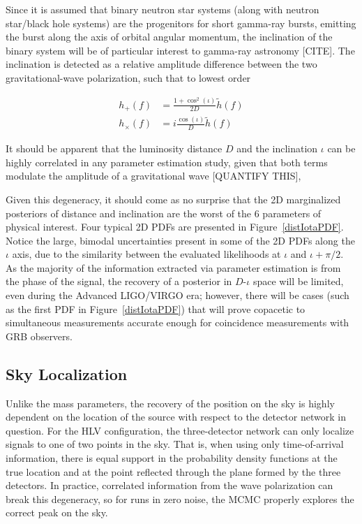 \documentclass[11pt,a4paper]{emulateapj}
\newcommand{\carl}[1]{{\color{red}  #1}}
\begin{document}
Since it is assumed that binary neutron star systems (along with neutron star/black hole systems) are the progenitors for short gamma-ray bursts, emitting the burst along the axis of orbital angular momentum, the inclination of the binary system will be of particular interest to gamma-ray astronomy \carl{[CITE]}.  The inclination is detected as a relative amplitude difference between the two gravitational-wave polarization, such that to lowest order

\begin{align}
h_+(f) &= \frac{1+\cos^2(\iota)}{2 D} \tilde{h}(f) \nonumber \\
h_\times(f) &= i \frac{\cos(\iota)}{D}\tilde{h}(f)
\end{align}

\noindent It should be apparent that the luminosity distance $D$ and the inclination $\iota$ can be highly correlated in any parameter estimation study, given that both terms modulate the amplitude of a gravitational wave \carl{[QUANTIFY THIS]}, 

Given this degeneracy, it should come as no surprise that the 2D marginalized posteriors of distance and inclination are the worst of the 6 
parameters of physical interest.  Four typical 2D PDFs are presented in Figure~\ref{distIotaPDF}.  Notice the large, bimodal uncertainties 
present in some of the 2D PDFs along the $\iota$ axis, due to the similarity between the evaluated likelihoods at $\iota$ and $\iota + \pi/2$. 
 As the majority of the information extracted via parameter estimation is from the phase of the signal, the recovery of a posterior in $D$-$\iota$
 space will be limited, even during the Advanced LIGO/VIRGO era; however, there will be cases (such as the first PDF in Figure~\ref{distIotaPDF}) 
 that will prove copacetic to simultaneous measurements accurate enough for coincidence measurements with GRB observers.


\subsection{Sky Localization}
\label{skySection}
 
Unlike the mass parameters, the recovery of the position on the sky is highly dependent 
on the location of the source with respect to the detector network in question. 
For the HLV configuration, the three-detector network can only localize signals to one of
two points in the sky.  That is, when using only time-of-arrival information, there is 
equal support in the probability density functions at the true location and at the 
point reflected through the plane formed by the three detectors.  In practice, 
correlated information from the wave polarization can break this degeneracy, so for runs in 
zero noise, the MCMC properly explores the correct peak on the sky.
\end{document}
